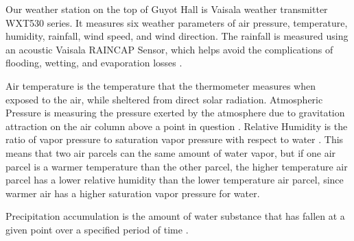 \documentclass[11pt]{report}
\begin{document}
% 

Our weather station on the top of Guyot Hall is Vaisala weather transmitter
WXT530 series. It measures six weather parameters of air pressure,
temperature, humidity, rainfall, wind speed, and wind direction. The
rainfall is measured using an acoustic Vaisala RAINCAP Sensor, which helps
avoid the complications of flooding, wetting, and evaporation losses
\cite[]{Vaisala}. 

Air temperature is the temperature that the thermometer measures when exposed to the air, while sheltered from direct solar radiation.
Atmospheric Pressure is measuring the pressure exerted by the atmosphere due to gravitation attraction on the air column above a point in question \cite{AMS}.  
Relative Humidity is the ratio of vapor pressure to saturation vapor pressure with respect to water \cite{AMS}.  
This means that two air parcels can the same amount of water vapor, but if one air parcel is a warmer temperature than the other parcel,
the higher temperature air parcel has a lower relative humidity than the lower 
temperature air parcel, since warmer air has a higher saturation vapor pressure for water. 

Precipitation accumulation is the amount of water substance that has fallen at a given point over a specified period of time \cite{AMS}. 
\end{document}
